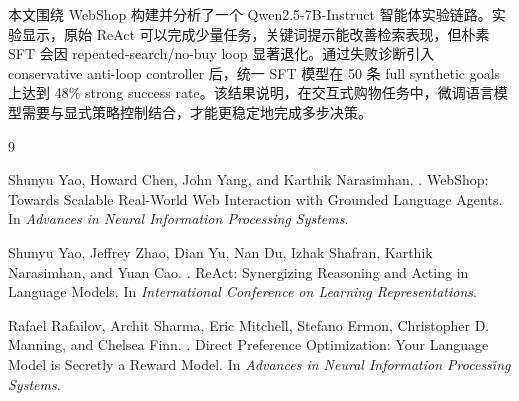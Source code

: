 \documentclass[11pt]{article}
\begin{document}
本文围绕 WebShop 构建并分析了一个 Qwen2.5-7B-Instruct 智能体实验链路。实验显示，原始 ReAct 可以完成少量任务，关键词提示能改善检索表现，但朴素 SFT 会因 repeated-search/no-buy loop 显著退化。通过失败诊断引入 conservative anti-loop controller 后，统一 SFT 模型在 50 条 full synthetic goals 上达到 48\% strong success rate。该结果说明，在交互式购物任务中，微调语言模型需要与显式策略控制结合，才能更稳定地完成多步决策。

\begin{thebibliography}{9}

Shunyu Yao, Howard Chen, John Yang, and Karthik Narasimhan.
.
\newblock WebShop: Towards Scalable Real-World Web Interaction with Grounded Language Agents.
\newblock In \textit{Advances in Neural Information Processing Systems}.

Shunyu Yao, Jeffrey Zhao, Dian Yu, Nan Du, Izhak Shafran, Karthik Narasimhan, and Yuan Cao.
.
\newblock ReAct: Synergizing Reasoning and Acting in Language Models.
\newblock In \textit{International Conference on Learning Representations}.

Rafael Rafailov, Archit Sharma, Eric Mitchell, Stefano Ermon, Christopher D. Manning, and Chelsea Finn.
.
\newblock Direct Preference Optimization: Your Language Model is Secretly a Reward Model.
\newblock In \textit{Advances in Neural Information Processing Systems}.

\end{thebibliography}
\end{document}
